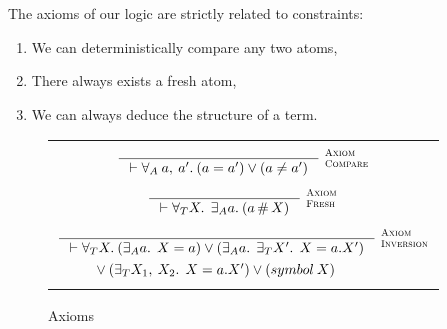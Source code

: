 \documentclass[english, mgr]{iithesis}
\newcommand{\scbrk}[2]{\myatop{\textsc{#1}}{\textsc{#2}}}
\begin{document}
The axioms of our logic are strictly related to constraints:
\begin{enumerate}
\item We can deterministically compare any two atoms,
\item There always exists a fresh atom,
\item We can always deduce the structure of a term.
\end{enumerate}
\begin{figure}[htpb]
  \centering
  \begin{tabularx}{\textwidth}{|C|}
  \hline
  \\ $
  \inference{
  }{
    \jgmnt[]{\fForallAtom{\:\atomv,\:\atomv'} (\atomv \ceq \atomv') \vee (\atomv \cneq \atomv')}
  }\:\scbrk{Axiom}{Compare}
  $ \\ \\ $
  \inference{
  }{
    \jgmnt[]{\fForallTerm{\termv} \:\fExistsAtom{\atomv} (\atomv \cfresh \termv)}
  }\:\scbrk{Axiom}{Fresh}
  $ \\ \\ $
  \inference{
  }{
    \jgmnt[]{\fForallTerm{\termv} (\fExistsAtom{\atomv}\: \termv = \atomv) \vee (\fExistsAtom{\atomv}\:\fExistsTerm{\termv'}\: \termv = \tbind{\atomv}{\termv'}) }
  }\:\scbrk{Axiom}{Inversion} $ \\
  $\vee \: (\exists_T X_1,\:X_2 .\:\: X = a.{X'}) \vee ({symbol}\: X) \qquad\qquad$ \\
  \\
  \hline
  \end{tabularx}
  \caption{Axioms}
  \label{fig:axioms}
\end{figure}
\end{document}
